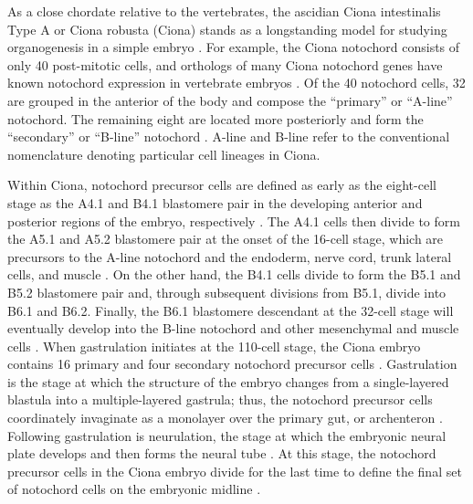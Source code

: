 \begin{dissertationintroduction}
    As a close chordate relative to the vertebrates, the ascidian Ciona intestinalis Type A or Ciona robusta (Ciona) stands as a longstanding model for studying organogenesis in a simple embryo \cite{dehal2002, delsuc2006, imai2006, satoh2014, satou2019, winkley2020}. For example, the Ciona notochord consists of only 40 post-mitotic cells, and orthologs of many Ciona notochord genes have known notochord expression in vertebrate embryos \cite{reeves2017, satoh2014, winkley2020}. Of the 40 notochord cells, 32 are grouped in the anterior of the body and compose the “primary” or “A-line” notochord. The remaining eight are located more posteriorly and form the “secondary” or “B-line” notochord \cite{satoh2014, winkley2020}. A-line and B-line refer to the conventional nomenclature denoting particular cell lineages in Ciona. 

    Within Ciona, notochord precursor cells are defined as early as the eight-cell stage as the A4.1 and B4.1 blastomere pair in the developing anterior and posterior regions of the embryo, respectively \cite{corbo1997, satoh2014, yagi2004}. The A4.1 cells then divide to form the A5.1 and A5.2 blastomere pair at the onset of the 16-cell stage, which are precursors to the A-line notochord and the endoderm, nerve cord, trunk lateral cells, and muscle \cite{satoh2014}. On the other hand, the B4.1 cells divide to form the B5.1 and B5.2 blastomere pair and, through subsequent divisions from B5.1, divide into B6.1 and B6.2. Finally, the B6.1 blastomere descendant at the 32-cell stage will eventually develop into the B-line notochord and other mesenchymal and muscle cells \cite{corbo1997, satoh2014, yagi2004}. When gastrulation initiates at the 110-cell stage, the Ciona embryo contains 16 primary and four secondary notochord precursor cells \cite{satoh2014}. Gastrulation is the stage at which the structure of the embryo changes from a single-layered blastula into a multiple-layered gastrula; thus, the notochord precursor cells coordinately invaginate as a monolayer over the primary gut, or archenteron \cite{rhee2005, winkley2020}. Following gastrulation is neurulation, the stage at which the embryonic neural plate develops and then forms the neural tube \cite{rhee2005, satoh2014}. At this stage, the notochord precursor cells in the Ciona embryo divide for the last time to define the final set of notochord cells on the embryonic midline \cite{nakamura2012}. 


\end{dissertationintroduction}
